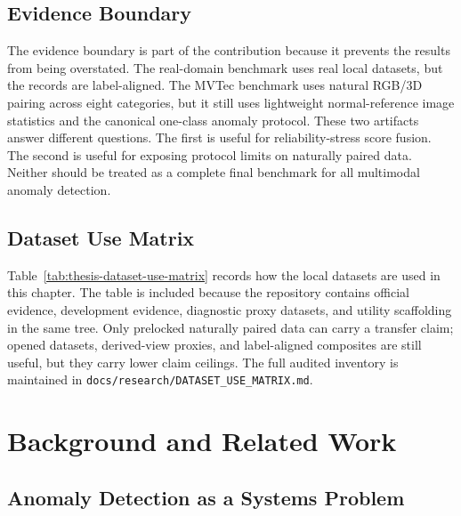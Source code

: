 \documentclass[11pt]{article}
\begin{document}
\subsection{Evidence Boundary}

The evidence boundary is part of the contribution because it prevents the
results from being overstated. The real-domain benchmark uses real local
datasets, but the records are label-aligned. The MVTec benchmark uses natural
RGB/3D pairing across eight categories, but it still uses lightweight
normal-reference image statistics and the canonical one-class anomaly protocol.
These two artifacts answer different questions. The first is useful for
reliability-stress score fusion. The second is useful for exposing protocol
limits on naturally paired data. Neither should be treated as a complete final
benchmark for all multimodal anomaly detection.

\subsection{Dataset Use Matrix}

Table~\ref{tab:thesis-dataset-use-matrix} records how the local datasets are
used in this chapter. The table is included because the repository contains
official evidence, development evidence, diagnostic proxy datasets, and utility
scaffolding in the same tree. Only prelocked naturally paired data can carry a
transfer claim; opened datasets, derived-view proxies, and label-aligned
composites are still useful, but they carry lower claim ceilings. The full
audited inventory is maintained in
\texttt{docs/research/DATASET\_USE\_MATRIX.md}.

\begin{table}[H]
\centering
\caption{Dataset-use matrix. Official, development, diagnostic, and
scaffolding datasets are separated to avoid overclaiming from opened or
derived-view results.}
\label{tab:thesis-dataset-use-matrix}
\scriptsize
{}
\end{table}

\section{Background and Related Work}

\subsection{Anomaly Detection as a Systems Problem}
\end{document}
